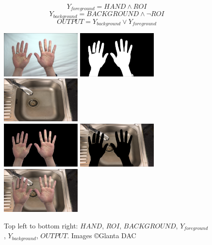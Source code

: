         \[ Y_{foreground} = HAND \land ROI \]
        \[ Y_{background} = BACKGROUND \land \lnot ROI \]
        \[ OUTPUT = Y_{background} \lor Y_{foreground} \]

        \begin{figure}[h]
            \centering
            \includegraphics[width=114pt]{../img/handspipeline/1.png}
            \includegraphics[width=114pt]{../img/handspipeline/2.png}
            \includegraphics[width=114pt]{../img/handspipeline/3.png}\\
            \includegraphics[width=114pt]{../img/handspipeline/4.png}
            \includegraphics[width=114pt]{../img/handspipeline/5.png}
            \includegraphics[width=114pt]{../img/handspipeline/6.png}
            \caption{Top left to bottom right: $HAND$, $ROI$, $BACKGROUND$, $Y_{foreground}$, $Y_{background}$, $OUTPUT$. Images \copyright \space Glanta DAC}
        \end{figure}

